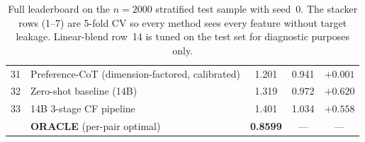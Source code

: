 \documentclass[11pt,a4paper]{article}
\newcommand{\best}[1]{\textcolor{goodgreen}{\textbf{#1}}}
\newcommand{\worst}[1]{\textcolor{badred}{#1}}
\begin{document}
\begin{table}[H]
\begin{tabular}{rlccc}
31 & Preference-CoT (dimension-factored, calibrated)                                 & 1.201         & 0.941  & $+0.001$ \\
32 & Zero-shot baseline (14B)                                                        & 1.319         & 0.972  & $+0.620$ \\
33 & 14B 3-stage CF pipeline                                                          & \worst{1.401} & 1.034  & $+0.558$ \\
\midrule
   & \textbf{ORACLE} (per-pair optimal)                                              & \best{0.8599} & ---    & --- \\
\bottomrule
\end{tabular}
\caption{Full leaderboard on the $n{=}2000$ stratified test sample with
seed~0. The stacker rows (1--7) are 5-fold CV so every method sees every
feature without target leakage. Linear-blend row~14 is tuned on the test
set for diagnostic purposes only.}
\label{tab:full_leaderboard}
\end{table}
\end{document}
